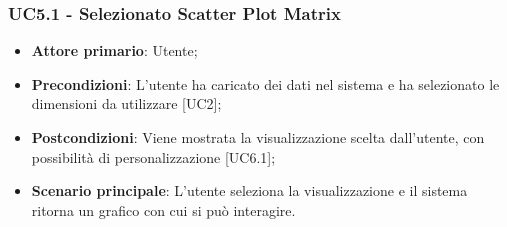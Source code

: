 \subsubsection{UC5.1 - Selezionato Scatter Plot Matrix}
\begin{itemize}
	\item \textbf{Attore primario}: Utente;
	\item \textbf{Precondizioni}: L'utente ha caricato dei dati nel sistema e ha selezionato le dimensioni da utilizzare [UC2];
	\item \textbf{Postcondizioni}: Viene mostrata la visualizzazione  scelta dall'utente, con possibilità di personalizzazione [UC6.1];
	\item \textbf{Scenario principale}: L'utente seleziona la visualizzazione  e il sistema ritorna un grafico con cui si può interagire.
\end{itemize}